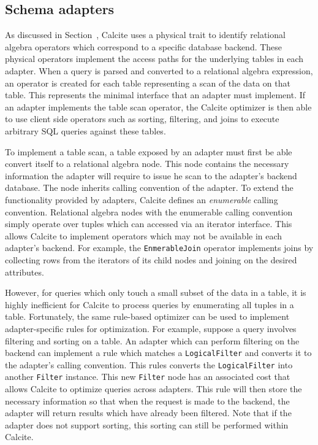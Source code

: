 \subsection{Schema adapters}
\label{subsec:adapters}

As discussed in Section~, Calcite uses a physical trait to identify relational algebra operators which correspond to a specific database backend.
These physical operators implement the access paths for the underlying tables in each adapter.
When a query is parsed and converted to a relational algebra expression, an operator is created for each table representing a scan of the data on that table.
This represents the minimal interface that an adapter must implement.
If an adapter implements the table scan operator, the Calcite optimizer is then able to use client side operators such as sorting, filtering, and joins to execute arbitrary SQL queries against these tables.

To implement a table scan, a table exposed by an adapter must first be able convert itself to a relational algebra node.
This node contains the necessary information the adapter will require to issue he scan to the adapter's backend database.
The node inherits calling convention of the adapter.
To extend the functionality provided by adapters, Calcite defines an \emph{enumerable} calling convention.
Relational algebra nodes with the enumerable calling convention simply operate over tuples which can accessed via an iterator interface.
This allows Calcite to implement operators which may not be available in each adapter's backend.
For example, the \texttt{EnmerableJoin} operator implements joins by collecting rows from the iterators of its child nodes and joining on the desired attributes.

However, for queries which only touch a small subset of the data in a table, it is highly inefficient for Calcite to process queries by enumerating all tuples in a table.
Fortunately, the same rule-based optimizer can be used to implement adapter-specific rules for optimization.
For example, suppose a query involves filtering and sorting on a table.
An adapter which can perform filtering on the backend can implement a rule which matches a \texttt{LogicalFilter} and converts it to the adapter's calling convention.
This rules converts the \texttt{LogicalFilter} into another \texttt{Filter} instance.
This new \texttt{Filter} node has an associated cost that allows Calcite to optimize queries across adapters.
This rule will then store the necessary information so that when the request is made to the backend, the adapter will return results which have already been filtered.
Note that if the adapter does not support sorting, this sorting can still be performed within Calcite.

